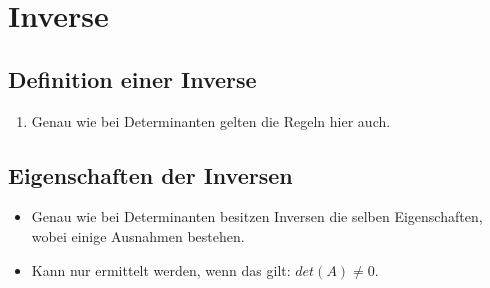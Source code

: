 \clearpage
\section{Inverse}

\subsection{Definition einer Inverse}
	\begin{enumerate}
		\item Genau wie bei Determinanten gelten die Regeln hier auch.
	\end{enumerate}

\subsection{Eigenschaften der Inversen}
	\begin{itemize}
		\item Genau wie bei Determinanten besitzen Inversen die selben Eigenschaften, wobei einige Ausnahmen bestehen.
		\item Kann nur ermittelt werden, wenn das gilt: $det (A) \neq 0$.
	\end{itemize}

